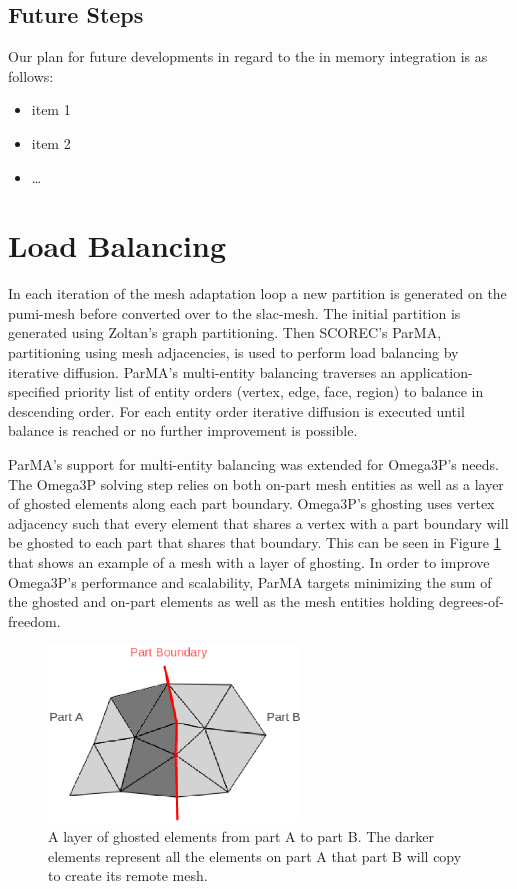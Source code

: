 \documentclass[review,12pt]{elsarticle_summary_report}
\begin{document}
\subsection{\label{in_memory_future} Future Steps}
Our plan for future developments in regard to the in memory integration is as follows:

\begin{itemize}
  \item item 1
  \item item 2
  \item \dots
\end{itemize}


\section{\label{load_balance}Load Balancing}
In each iteration of the mesh adaptation loop a new partition is generated on the
pumi-mesh before converted over to the slac-mesh. The initial partition is generated
using Zoltan's graph partitioning. Then SCOREC's ParMA, partitioning using mesh adjacencies,
is used to perform load balancing by iterative diffusion. ParMA's multi-entity balancing
traverses an application-specified priority list of entity orders (vertex, edge, face,
region) to balance in descending order.
For each entity order iterative diffusion is executed until balance is reached
or no further improvement is possible.

ParMA's support for multi-entity balancing was extended for Omega3P's needs.
The Omega3P solving step relies on both on-part mesh entities as well as a layer
of ghosted elements along each part boundary.
Omega3P's ghosting uses vertex adjacency such that every element that shares a
vertex with a part boundary will be ghosted to each part that shares that
boundary.
This can be seen in Figure \ref{fig:ghost3} that shows an example of a mesh with
a layer of ghosting.
In order to improve Omega3P's performance and scalability, ParMA targets
minimizing the sum of the ghosted and on-part elements as well as the mesh
entities holding degrees-of-freedom.

\begin{figure}[!ph]
\centering
\includegraphics[width=0.6\textwidth]{ghost.eps} 
\caption{\label{fig:ghost3} A layer of ghosted elements from part A to part B. The darker elements represent all the elements on part A that part B will copy to create its remote mesh.}
\end{figure}
\end{document}
